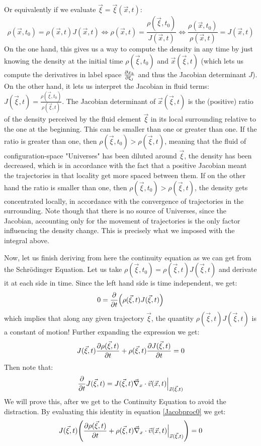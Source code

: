 \documentclass[11pt, a4paper]{article} %
\begin{document}
Or equivalently if we evaluate $\vec{\xi}=\vec{\xi}(\vec{x},t)$:
\begin{equation}
\rho(\vec{x},t_0) = \rho(\vec{x},t) J(\vec{x},t)\Longleftrightarrow \rho(\vec{x},t)=\frac{\rho(\vec{\xi},t_0)}{J(\vec{x},t)}\Longleftrightarrow \frac{\rho(\vec{x},t_0)}{\rho(\vec{x},t)}=J(\vec{x},t)
\end{equation}
On the one hand, this gives us a way to compute the density in any time by just knowing the density at the initial time $\rho(\vec{\xi},t_0)$ and $\vec{x}(\vec{\xi},t)$ (which lets us compute the derivatives in label space $\pdv{x_k}{\xi_j}$ and thus the Jacobian determinant $J$). On the other hand, it lets us interpret the Jacobian in fluid terms: $J(\vec{\xi},t)=\frac{\rho(\vec{\xi},t_0)}{\rho(\vec{\xi},t)}$. The Jacobian determinant of $\vec	{x}(\vec{\xi},t)$ is the (positive) ratio of the density perceived by the fluid element $\vec{\xi}$ in its local surrounding relative to the one at the beginning. This can be smaller than one or greater than one. If the ratio is greater than one, then $\rho(\vec{\xi},t_0)>\rho(\vec{\xi},t)$, meaning that the fluid of configuration-space "Universes" has been diluted around $\vec{\xi}$, the density has been decreased, which is in accordance with the fact that a positive Jacobian meant the trajectories in that locality get more spaced between them. If on the other hand the ratio is smaller than one, then $\rho(\vec{\xi},t_0)>\rho(\vec{\xi},t)$, the density gets concentrated locally, in accordance with the convergence of trajectories in the surrounding. Note though that there is no source of Universes, since the Jacobian, accounting only for the movement of trajectories is the only factor influencing the density change. This is precisely what we imposed with the integral above.

Now, let us finish deriving from here the continuity equation as we can get from the Schrödinger Equation. Let us take $\rho(\vec{\xi},t_0) = \rho(\vec{\xi},t) J(\vec{\xi},t)$ and derivate it at each side in time. Since the left hand side is time independent, we get:
\begin{equation}
0=\pdv{}{t}\qty( \rho(\vec{\xi},t) J(\vec{\xi},t))
\end{equation}
which implies that along any given trajectory $\vec{\xi}$, the quantity $\rho(\vec{\xi},t) J(\vec{\xi},t)$ is a constant of motion! Further expanding the expression we get:
\begin{equation}\label{Jacobproc0}
J(\vec{\xi},t)\pdv{\rho(\vec{\xi},t)}{t}+\rho(\vec{\xi},t)\pdv{J(\vec{\xi},t)}{t}=0
\end{equation}
Then note that:
\begin{equation}\label{jainkoa}
\pdv{}{t}J(\vec{\xi},t)=J(\vec{\xi},t)\vec{\nabla}_x\cdot\vec{v}(\vec{x},t)\Big\rvert_{\vec{x}(\vec{\xi},t)}
\end{equation}
We will prove this, after we get to the Continuity Equation to avoid the distraction. By evaluating this identity in  equation \eqref{Jacobproc0} we get:
\begin{equation}
J(\vec{\xi},t)\qty(\pdv{\rho(\vec{\xi},t)}{t}+\rho(\vec{\xi},t)\vec{\nabla}_x\cdot\vec{v}(\vec{x},t)\Big\rvert_{\vec{x}(\vec{\xi},t)})=0
\end{equation}
\end{document}
